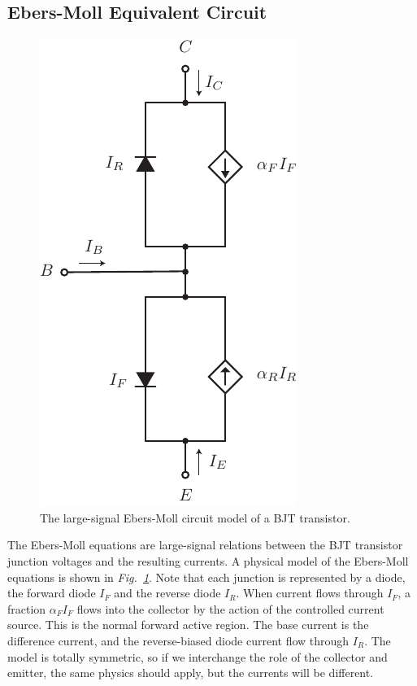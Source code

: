 \subsection{Ebers-Moll Equivalent Circuit}
\begin{figure}[tb]
\centering
\includegraphics[scale=.7]{slide17_ebers_moll}
\caption{The large-signal Ebers-Moll circuit model of a BJT transistor.}
\label{fig:slide17_ebers_moll}
\end{figure}
The Ebers-Moll equations are large-signal relations between the BJT transistor junction voltages and the resulting currents.  A physical model of the Ebers-Moll equations is shown in \emph{Fig.~\ref{fig:slide17_ebers_moll}}.  Note that each junction is represented by a diode, the forward diode $I_F$ and the reverse diode $I_R$.  When current flows through $I_F$, a fraction $\alpha_F I_F$ flows into the collector by the action of the controlled current source.  This is the normal forward active region. The base current is the difference current, and the reverse-biased diode current flow through $I_R$.  The model is totally symmetric, so if we interchange the role of the collector and emitter, the same physics should apply, but the currents will be different.  
